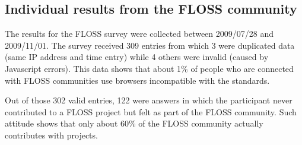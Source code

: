 \documentclass[lnbip]{svmultln}
\begin{document}
\subsection{Individual results from the FLOSS community}
\label{subsec:floss-results}

The results for the FLOSS survey were collected between 2009/07/28 and
2009/11/01. The survey received 309 entries from which 3 were
duplicated data (same IP address and time entry) while 4 others were
invalid (caused by Javascript errors). This data
shows that about 1\% of people who are connected with FLOSS
communities use browsers incompatible with the standards.

Out of those 302 valid entries, 122 were answers in which the
participant never contributed to a FLOSS project but felt as part of
the FLOSS community. Such attitude shows that only about 60\% of the
FLOSS community actually contributes with projects.
\end{document}
